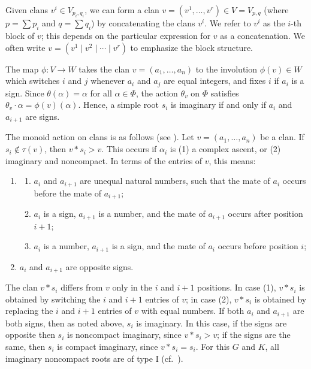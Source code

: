 \documentclass[11pt,letterpaper,reqno]{amsart}
\numberwithin{equation}{section}
\theoremstyle{plain}
\theoremstyle{definition}
\theoremstyle{remark}
\begin{document}
Given clans $v^i \in V_{p_i, q_i}$, we can form a clan $v = (v^1, \ldots, v^r) \in V = V_{p,q}$ (where $p = \sum p_i$ and $q = \sum q_i $)
by concatenating the clans $v^i$.
We refer to $v^i$ as the $i$-th block of $v$; this depends on the particular
expression for $v$ as a concatenation.  We often write $v =(v^1 \mid  v^2 \mid \cdots \mid v^r)$ to emphasize the block structure.
 
The map $\phi: V \to W$ takes the clan $v = (a_1, \ldots, a_n)$ to the involution $\phi(v) \in W$ which switches $i$ and $j$ whenever $a_i$ and $a_j$ are equal integers,
and fixes $i$ if $a_i$ is a sign.  Since $\theta(\alpha) = \alpha$ for all $\alpha \in \Phi$,
 the action $\theta_v$ on $\Phi$
satisfies $\theta_v\cdot \alpha = \phi(v) (\alpha)$.  Hence, a simple root $s_i$ is imaginary if and only if $a_i$ and $a_{i+1}$ are signs.

The monoid action on clans is as follows (see \cite{MT}).  Let $v = (a_1, \ldots, a_n)$ be a clan.  
If $s_i \not\in \tau(v)$, then $v*s_i> v$.
This occurs if $\alpha_i$ is (1) a complex ascent, or 
(2) imaginary and noncompact.  In terms of the entries of $v$, this means:
\begin{enumerate}
\item \begin{enumerate}
\item $a_i$ and $a_{i+1}$ are unequal natural numbers, such that the mate of $a_i$ occurs before the mate of $a_{i+1}$;
\item $a_i$ is a sign, $a_{i+1}$ is a number, and the mate of $a_{i+1}$ occurs after position $i+1$;
\item $a_i$ is a number, $a_{i+1}$ is a sign, and the mate of $a_i$ occurs before position $i$;
\end{enumerate}
\item $a_i$ and $a_{i+1}$ are opposite signs.
\end{enumerate}
The clan $v * s_i$ differs from $v$ only in the $i$ and $i+1$ positions.  In case (1), $v*s_i$ is obtained by switching the $i$ and $i+1$ entries of $v$; in case (2), $v*s_i$ is obtained by replacing the $i$ and $i+1$ entries of $v$ with equal numbers.  
If both $a_i$ and $a_{i+1}$ are both signs, then as noted above, $s_i$ is imaginary.  In this case, if the signs are opposite then $s_i$ is noncompact imaginary, 
since $v*s_i > v$; if the signs are the same, then $s_i$ is compact imaginary, since $v*s_i = s_i$.  For this $G$ and $K$, all imaginary noncompact roots are of type I (cf.~\cite[Corollary 2]{Brion2001}).  
\end{document}
